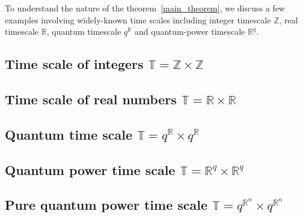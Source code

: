 To understand the nature of the theorem~\ref{main_theorem},
we discuss a few examples involving widely-known time scales
including integer timescale $\mathbb{Z}$,
real timescale $\mathbb{R}$,
quantum timescale $q^{\mathbb{R}}$ and
quantum-power timescale $\mathbb{R}^q$.

\subsection{Time scale of integers $\mathbb{T} = \mathbb{Z} \times \mathbb{Z}$} \label{subsec:time_scale_z}


\subsection{Time scale of real numbers $\mathbb{T} = \mathbb{R} \times \mathbb{R}$} \label{subsec:time_scale_r}


\subsection{Quantum time scale $\mathbb{T} = q^\mathbb{R} \times q^\mathbb{R}$} \label{subsec:time_scale_qn}


\subsection{Quantum power time scale $\mathbb{T} = \mathbb{R}^q \times \mathbb{R}^q$} \label{subsec:time_scale_nq}


\subsection{Pure quantum power time scale $\mathbb{T} = q^{\mathbb{R}^n} \times q^{\mathbb{R}^n}$} \label{subsec:pure_quantum_power}

